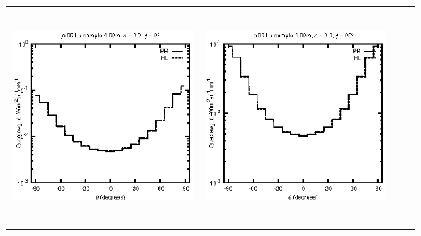 \begin{tabular}{c c c c}
\includegraphics[height=7cm]{../eps/jol00_Lu_sample_4.00m_fwd.eps} &
\includegraphics[height=7cm]{../eps/jol00_Lu_sample_4.00m_cross.eps} \\
\end{tabular}

\pagebreak

